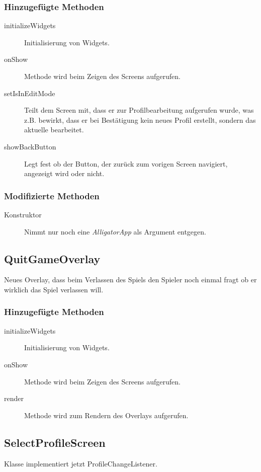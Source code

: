 \subsubsection{Hinzugefügte Methoden}
\begin{description}
\item[initializeWidgets]
Initialisierung von Widgets.
\item[onShow]
Methode wird beim Zeigen des Screens aufgerufen.
\item[setIsInEditMode]
Teilt dem Screen mit, dass er zur Profilbearbeitung aufgerufen wurde, was z.B. bewirkt, dass er bei Bestätigung kein neues Profil erstellt, sondern das aktuelle bearbeitet.
\item[showBackButton]
Legt fest ob der Button, der zurück zum vorigen Screen navigiert, angezeigt wird oder nicht.
\end{description}

\subsubsection{Modifizierte Methoden}
\begin{description}
\item[Konstruktor]
Nimmt nur noch eine \emph{AlligatorApp} als Argument entgegen.

\end{description}




\subsection{QuitGameOverlay}
Neues Overlay, dass beim Verlassen des Spiels den Spieler noch einmal fragt ob er wirklich das Spiel verlassen will.

\subsubsection{Hinzugefügte Methoden}
\begin{description}
\item[initializeWidgets]
Initialisierung von Widgets.
\item[onShow]
Methode wird beim Zeigen des Screens aufgerufen.
\item[render]
Methode wird zum Rendern des Overlays aufgerufen.
\end{description}


\subsection{SelectProfileScreen}
Klasse implementiert jetzt ProfileChangeListener.
